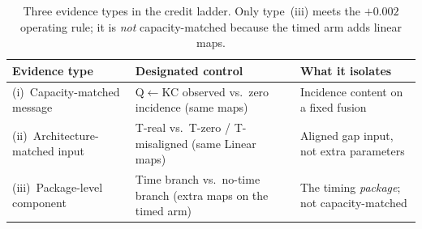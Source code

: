 \begin{table}[H]
\caption{Three evidence types in the credit ladder. Only type~(iii)
meets the $+0.002$ operating rule; it is \emph{not} capacity-matched
because the timed arm adds linear maps.}
\label{tab:evidence-types}
\centering
\footnotesize
\begin{tabularx}{\textwidth}{@{}>{\raggedright\arraybackslash}p{3.2cm}
>{\raggedright\arraybackslash}p{5.0cm}
>{\raggedright\arraybackslash}X@{}}
\toprule
Evidence type & Designated control & What it isolates \\
\midrule
(i)~Capacity-matched message & Q$\leftarrow$KC observed vs.\ zero
incidence (same maps) & Incidence content on a fixed fusion \\
(ii)~Architecture-matched input & T-real vs.\ T-zero / T-misaligned
(same Linear maps) & Aligned gap input, not extra parameters \\
(iii)~Package-level component & Time branch vs.\ no-time branch
(extra maps on the timed arm) & The timing \emph{package}; not
capacity-matched \\
\bottomrule
\end{tabularx}
\end{table}
